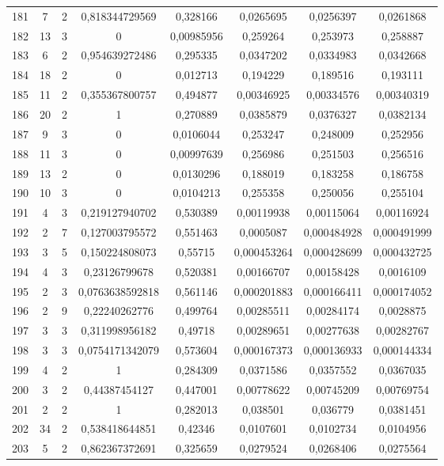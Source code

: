 \begin{longtable}{|c|c|c|c|c|c|c|c|}
181 & 7 & 2 & 0,818344729569 & 0,328166 & 0,0265695 & 0,0256397 & 0,0261868  \\
182 & 13 & 3 & 0 & 0,00985956 & 0,259264 & 0,253973 & 0,258887  \\
183 & 6 & 2 & 0,954639272486 & 0,295335 & 0,0347202 & 0,0334983 & 0,0342668  \\
184 & 18 & 2 & 0 & 0,012713 & 0,194229 & 0,189516 & 0,193111  \\
185 & 11 & 2 & 0,355367800757 & 0,494877 & 0,00346925 & 0,00334576 & 0,00340319  \\
186 & 20 & 2 & 1 & 0,270889 & 0,0385879 & 0,0376327 & 0,0382134  \\
187 & 9 & 3 & 0 & 0,0106044 & 0,253247 & 0,248009 & 0,252956  \\
188 & 11 & 3 & 0 & 0,00997639 & 0,256986 & 0,251503 & 0,256516  \\
189 & 13 & 2 & 0 & 0,0130296 & 0,188019 & 0,183258 & 0,186758  \\
190 & 10 & 3 & 0 & 0,0104213 & 0,255358 & 0,250056 & 0,255104  \\
191 & 4 & 3 & 0,219127940702 & 0,530389 & 0,00119938 & 0,00115064 & 0,00116924  \\
192 & 2 & 7 & 0,127003795572 & 0,551463 & 0,0005087 & 0,000484928 & 0,000491999  \\
193 & 3 & 5 & 0,150224808073 & 0,55715 & 0,000453264 & 0,000428699 & 0,000432725  \\
194 & 4 & 3 & 0,23126799678 & 0,520381 & 0,00166707 & 0,00158428 & 0,0016109  \\
195 & 2 & 3 & 0,0763638592818 & 0,561146 & 0,000201883 & 0,000166411 & 0,000174052  \\
196 & 2 & 9 & 0,22240262776 & 0,499764 & 0,00285511 & 0,00284174 & 0,0028875  \\
197 & 3 & 3 & 0,311998956182 & 0,49718 & 0,00289651 & 0,00277638 & 0,00282767  \\
198 & 3 & 3 & 0,0754171342079 & 0,573604 & 0,000167373 & 0,000136933 & 0,000144334  \\
199 & 4 & 2 & 1 & 0,284309 & 0,0371586 & 0,0357552 & 0,0367035  \\
200 & 3 & 2 & 0,44387454127 & 0,447001 & 0,00778622 & 0,00745209 & 0,00769754  \\
201 & 2 & 2 & 1 & 0,282013 & 0,038501 & 0,036779 & 0,0381451  \\
202 & 34 & 2 & 0,538418644851 & 0,42346 & 0,0107601 & 0,0102734 & 0,0104956  \\
203 & 5 & 2 & 0,862367372691 & 0,325659 & 0,0279524 & 0,0268406 & 0,0275564  \\

\end{longtable}
